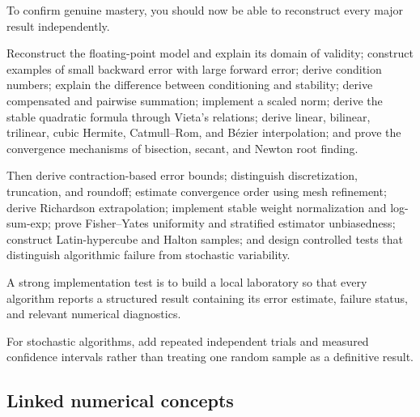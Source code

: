 To confirm genuine mastery, you should now be able to reconstruct every major result independently.

Reconstruct the floating-point model and explain its domain of validity; construct examples of small backward error with large forward error; derive condition numbers; explain the difference between conditioning and stability; derive compensated and pairwise summation; implement a scaled norm; derive the stable quadratic formula through Vieta's relations; derive linear, bilinear, trilinear, cubic Hermite, Catmull--Rom, and Bézier interpolation; and prove the convergence mechanisms of bisection, secant, and Newton root finding.

Then derive contraction-based error bounds; distinguish discretization, truncation, and roundoff; estimate convergence order using mesh refinement; derive Richardson extrapolation; implement stable weight normalization and log-sum-exp; prove Fisher--Yates uniformity and stratified estimator unbiasedness; construct Latin-hypercube and Halton samples; and design controlled tests that distinguish algorithmic failure from stochastic variability.

A strong implementation test is to build a local laboratory so that every algorithm reports a structured result containing its error estimate, failure status, and relevant numerical diagnostics.

For stochastic algorithms, add repeated independent trials and measured confidence intervals rather than treating one random sample as a definitive result.

\subsection{Linked numerical concepts}\label{02-foundations-ii-ch039-linked-numerical-concepts}

\hypertarget{02-foundations-ii-ch039-linked-numerical-concepts}{}

